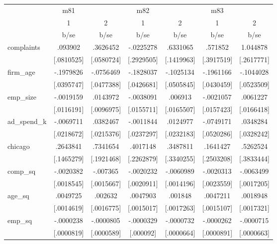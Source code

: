 \begin{tabular}{l*{6}{c}}
            &         m81&            &         m82&            &         m83&            \\
            &           1&           2&           1&           2&           1&           2\\
            &        b/se&        b/se&        b/se&        b/se&        b/se&        b/se\\
complaints  &     .093902&    .3626452&   -.0225278&    .6331065&     .571852&    1.044878\\
            &  [.0810525]&  [.0580724]&  [.2929505]&  [.1419963]&  [.3917519]&  [.2617771]\\
firm\_age    &   -.1979826&   -.0756469&   -.1828037&   -.1025134&   -.1961166&   -.1044028\\
            &  [.0395747]&  [.0477388]&  [.0426681]&  [.0505845]&  [.0430459]&  [.0523509]\\
emp\_size    &   -.0019159&    .0143972&   -.0038091&     .006913&   -.0021057&    .0061227\\
            &  [.0116191]&  [.0096975]&  [.0155711]&  [.0165507]&  [.0157423]&  [.0166418]\\
ad\_spend\_k  &   -.0069711&    .0382467&   -.0011844&    .0124977&   -.0749171&    .0348284\\
            &  [.0218672]&  [.0215376]&  [.0237297]&  [.0232183]&  [.0520286]&  [.0328242]\\
chicago     &    .2643841&    .7341654&    .4017148&    .3487811&    .1641427&    .5262524\\
            &  [.1465279]&  [.1921468]&  [.2262879]&  [.3340255]&  [.2503208]&  [.3833444]\\
comp\_sq     &   -.0020382&    -.007365&   -.0020232&   -.0060989&   -.0020313&   -.0063499\\
            &  [.0018545]&  [.0015667]&  [.0020911]&  [.0014196]&  [.0023559]&  [.0017205]\\
age\_sq      &    .0049725&     .002632&    .0047903&     .001848&    .0047211&    .0018948\\
            &  [.0014619]&  [.0016775]&  [.0015017]&  [.0017263]&  [.0015107]&  [.0017321]\\
emp\_sq      &   -.0000238&   -.0000805&   -.0000329&   -.0000732&   -.0000262&   -.0000715\\
            &  [.0000819]&  [.0000589]&   [.000092]&  [.0000664]&  [.0000891]&  [.0000663]\\

\end{tabular}
